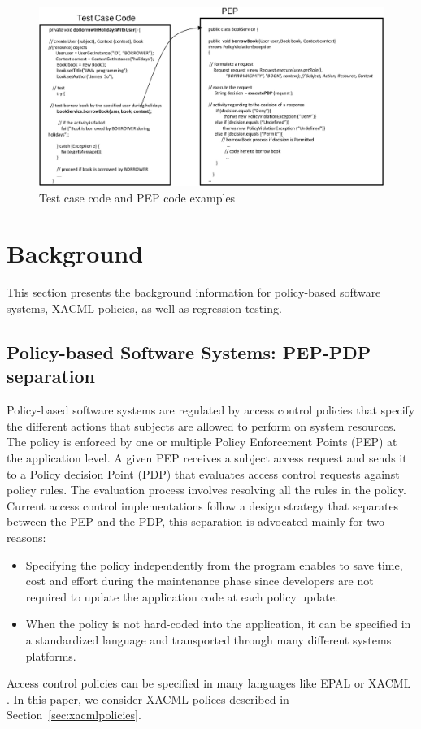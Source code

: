 
\begin{figure}[ht]
    \centering
    \vspace{+5pt}
        \includegraphics[width=5.5in]{testcase-pep.eps}
       \vspace{-4pt}
    \caption{\label{fig:testcase-pep} Test case code and PEP code examples}
   \vspace{-10pt}
    \vspace{+3pt}
\end{figure}
  
\section{Background}
\label{sec:background}
This section presents the background information for policy-based software systems, XACML policies, as well as regression testing.


\subsection{Policy-based Software Systems: PEP-PDP separation}


Policy-based software systems are regulated by access control policies that specify the different actions that subjects are allowed to perform on system resources. 
The policy is enforced by one or multiple Policy Enforcement Points (PEP) at the application level. A given PEP receives a subject access request and 
sends it to a Policy decision Point (PDP) that evaluates access control requests against policy rules. The evaluation process involves resolving all the rules in the policy. 
Current access control implementations follow a design strategy that separates between the PEP and the PDP, this separation is advocated mainly for two reasons:
\begin{itemize}
\item Specifying the policy independently from the program enables to save time, cost and effort during the maintenance phase since developers are not required 
to update the application code at each policy update.
\item When the policy is not hard-coded into the application, it can be specified in a standardized language and transported through many different systems platforms.
\end{itemize}
Access control policies can be specified in many languages like EPAL \cite{epal} or XACML \cite {oasis05:xacml}. 
In this paper, we consider XACML polices described in Section~\ref{sec:xacmlpolicies}.

